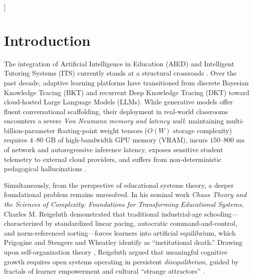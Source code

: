 \documentclass[10pt,twocolumn,a4paper]{article}
\begin{document}
\begin{@twocolumnfalse}
\begin{abstract}
      \noindent \textbf{Keywords:} Procedural Fractal Pedagogy; Artificial Intelligence in Education (AIED); Chaos and Complexity Theory; Reigeluth Systemic Transformation; Saturn School Paradox; Zone of Proximal Development (ZPD); Zero-Storage Neural Synthesis; Orbital Error Dynamics; Lean 4 Formal Verification.
    \end{abstract}
    \vspace{0.4cm}
  \end{@twocolumnfalse}
]

\section{Introduction}

The integration of Artificial Intelligence in Education (AIED) and Intelligent Tutoring Systems (ITS) currently stands at a structural crossroads \cite{hwang2020vision,kasneci2023chatgpt}. Over the past decade, adaptive learning platforms have transitioned from discrete Bayesian Knowledge Tracing (BKT) \cite{corbett1994knowledge} and recurrent Deep Knowledge Tracing (DKT) \cite{piech2015deep} toward cloud-hosted Large Language Models (LLMs). While generative models offer fluent conversational scaffolding, their deployment in real-world classrooms encounters a severe \textit{Von Neumann memory and latency wall}: maintaining multi-billion-parameter floating-point weight tensors ($O(W)$ storage complexity) requires $4\text{--}80\text{ GB}$ of high-bandwidth GPU memory (VRAM), incurs $150\text{--}800\text{ ms}$ of network and autoregressive inference latency, exposes sensitive student telemetry to external cloud providers, and suffers from non-deterministic pedagogical hallucinations \cite{dagli2026werr,dagli2026mandelbrot}.

Simultaneously, from the perspective of educational systems theory, a deeper foundational problem remains unresolved. In his seminal work \textit{Chaos Theory and the Sciences of Complexity: Foundations for Transforming Educational Systems}, Charles M. Reigeluth \cite{reigeluth2008chaos} demonstrated that traditional industrial-age schooling---characterized by standardized linear pacing, autocratic command-and-control, and norm-referenced sorting---forces learners into artificial equilibrium, which Prigogine and Stengers \cite{prigogine1984order} and Wheatley \cite{wheatley1999leadership} identify as ``institutional death.'' Drawing upon self-organization theory \cite{jantsch1980self}, Reigeluth argued that meaningful cognitive growth requires open systems operating in persistent \textit{disequilibrium}, guided by fractals of learner empowerment and cultural ``strange attractors'' \cite{reigeluth2008chaos}.
\end{document}
